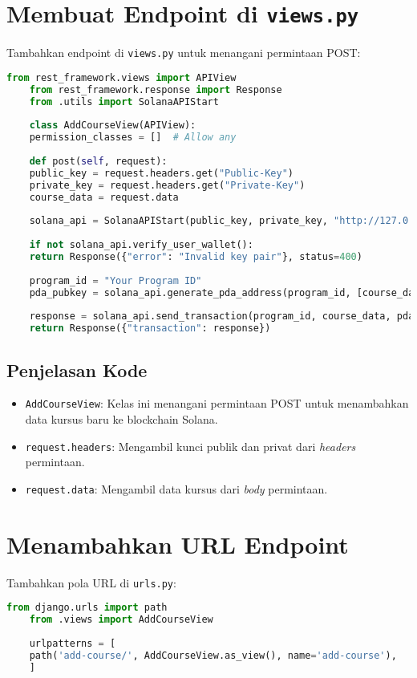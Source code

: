 \section{Membuat Endpoint di \texttt{views.py}}
Tambahkan endpoint di \texttt{views.py} untuk menangani permintaan POST:

\begin{lstlisting}[language=Python]
	from rest_framework.views import APIView
	from rest_framework.response import Response
	from .utils import SolanaAPIStart
	
	class AddCourseView(APIView):
	permission_classes = []  # Allow any
	
	def post(self, request):
	public_key = request.headers.get("Public-Key")
	private_key = request.headers.get("Private-Key")
	course_data = request.data
	
	solana_api = SolanaAPIStart(public_key, private_key, "http://127.0.0.1:8899")
	
	if not solana_api.verify_user_wallet():
	return Response({"error": "Invalid key pair"}, status=400)
	
	program_id = "Your Program ID"
	pda_pubkey = solana_api.generate_pda_address(program_id, [course_data['name'], course_data['start_date']])
	
	response = solana_api.send_transaction(program_id, course_data, pda_pubkey)
	return Response({"transaction": response})
\end{lstlisting}

\subsection{Penjelasan Kode}
\begin{itemize}
	\item \texttt{AddCourseView}: Kelas ini menangani permintaan POST untuk menambahkan data kursus baru ke blockchain Solana.
	\item \texttt{request.headers}: Mengambil kunci publik dan privat dari \textit{headers} permintaan.
	\item \texttt{request.data}: Mengambil data kursus dari \textit{body} permintaan.
\end{itemize}

\section{Menambahkan URL Endpoint}
Tambahkan pola URL di \texttt{urls.py}:

\begin{lstlisting}[language=Python]
	from django.urls import path
	from .views import AddCourseView
	
	urlpatterns = [
	path('add-course/', AddCourseView.as_view(), name='add-course'),
	]
\end{lstlisting}

